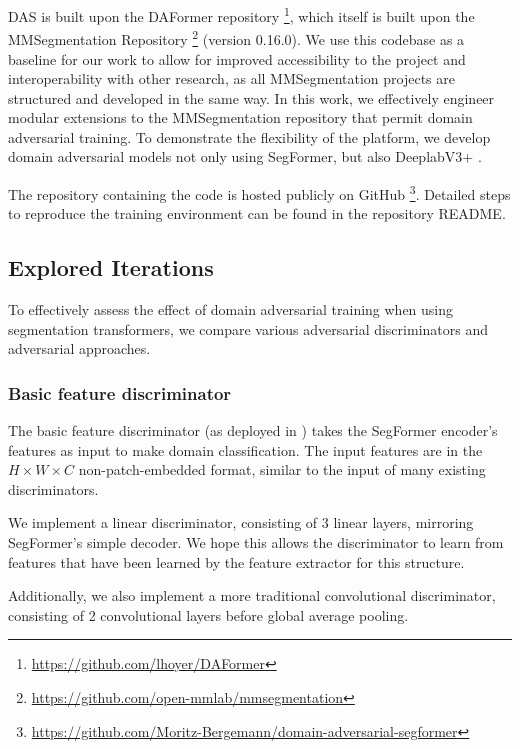 \documentclass[a4paper,12pt]{report}
\begin{document}
DAS is built upon the DAFormer \cite{hoyer_daformer_2022} repository \footnote{\url{https://github.com/lhoyer/DAFormer}}, which itself is built upon the MMSegmentation Repository \footnote{\url{https://github.com/open-mmlab/mmsegmentation}} (version 0.16.0). We use this codebase as a baseline for our work to allow for improved accessibility to the project and interoperability with other research, as all MMSegmentation projects are structured and developed in the same way. In this work, we effectively engineer modular extensions to the MMSegmentation repository that permit domain adversarial training. To demonstrate the flexibility of the platform, we develop domain adversarial models not only using SegFormer, but also DeeplabV3+ \cite{chen_encoder-decoder_2018}.

The repository containing the code is hosted publicly on GitHub \footnote{\url{https://github.com/Moritz-Bergemann/domain-adversarial-segformer}}. Detailed steps to reproduce the training environment can be found in the repository README.

\subsection{Explored Iterations}
To effectively assess the effect of domain adversarial training when using segmentation transformers, we compare various adversarial discriminators and adversarial approaches.

\subsubsection{Basic feature discriminator}
The basic feature discriminator (as deployed in \cite{hoffman_fcns_2016}) takes the SegFormer encoder's features as input to make domain classification. The input features are in the $H \times W \times C$ non-patch-embedded format, similar to the input of many existing discriminators.

We implement a linear discriminator, consisting of 3 linear layers, mirroring SegFormer's simple decoder. We hope this allows the discriminator to learn from features that have been learned by the feature extractor for this structure.

Additionally, we also implement a more traditional convolutional discriminator, consisting of 2 convolutional layers before global average pooling.
\end{document}
